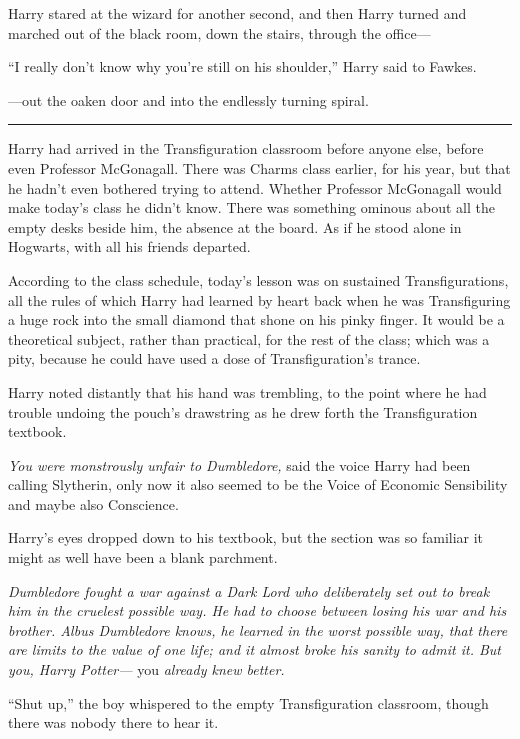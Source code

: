 Harry stared at the wizard for another second, and then Harry turned and
marched out of the black room, down the stairs, through the office---

``I really don't know why you're still on his shoulder,'' Harry said to
Fawkes.

---out the oaken door and into the endlessly turning spiral.

\begin{center}\rule{3in}{0.4pt}\end{center}

Harry had arrived in the Transfiguration classroom before anyone else,
before even Professor McGonagall. There was Charms class earlier, for
his year, but that he hadn't even bothered trying to attend. Whether
Professor McGonagall would make today's class he didn't know. There was
something ominous about all the empty desks beside him, the absence at
the board. As if he stood alone in Hogwarts, with all his friends
departed.

According to the class schedule, today's lesson was on sustained
Transfigurations, all the rules of which Harry had learned by heart back
when he was Transfiguring a huge rock into the small diamond that shone
on his pinky finger. It would be a theoretical subject, rather than
practical, for the rest of the class; which was a pity, because he could
have used a dose of Transfiguration's trance.

Harry noted distantly that his hand was trembling, to the point where he
had trouble undoing the pouch's drawstring as he drew forth the
Transfiguration textbook.

\emph{You were monstrously unfair to Dumbledore,} said the voice Harry
had been calling Slytherin, only now it also seemed to be the Voice of
Economic Sensibility and maybe also Conscience.

Harry's eyes dropped down to his textbook, but the section was so
familiar it might as well have been a blank parchment.

\emph{Dumbledore fought a war against a Dark Lord who deliberately set
out to break him in the cruelest possible way. He had to choose between
losing his war and his brother. Albus Dumbledore knows, he learned in
the worst possible way, that there are limits to the value of one life;
and it almost broke his sanity to admit it. But you, Harry Potter---}
you \emph{already knew better.}

``Shut up,'' the boy whispered to the empty Transfiguration classroom,
though there was nobody there to hear it.

